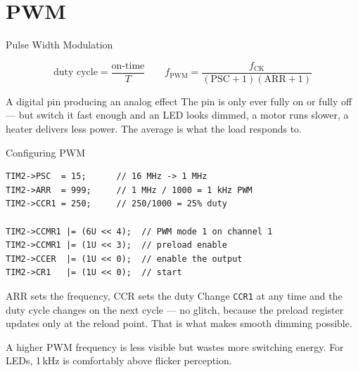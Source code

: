 \documentclass[aspectratio=169]{beamer}
\begin{document}
\section{PWM}

\begin{frame}{Pulse Width Modulation}
\centering
{}

\vspace{1em}
\[
\text{duty cycle} = \frac{\text{on-time}}{T}
\qquad
f_{\text{PWM}} = \frac{f_{\text{CK}}}{(\text{PSC}+1)(\text{ARR}+1)}
\]

\vspace{0.5em}
\begin{block}{A digital pin producing an analog effect}
The pin is only ever fully on or fully off --- but switch it fast enough
and an LED looks dimmed, a motor runs slower, a heater delivers less
power. The average is what the load responds to.
\end{block}
\end{frame}

\begin{frame}[fragile]{Configuring PWM}
\begin{lstlisting}
TIM2->PSC  = 15;      // 16 MHz -> 1 MHz
TIM2->ARR  = 999;     // 1 MHz / 1000 = 1 kHz PWM
TIM2->CCR1 = 250;     // 250/1000 = 25% duty

TIM2->CCMR1 |= (6U << 4);  // PWM mode 1 on channel 1
TIM2->CCMR1 |= (1U << 3);  // preload enable
TIM2->CCER  |= (1U << 0);  // enable the output
TIM2->CR1   |= (1U << 0);  // start
\end{lstlisting}

\begin{block}{ARR sets the frequency, CCR sets the duty}
Change \texttt{CCR1} at any time and the duty cycle changes on the next
cycle --- no glitch, because the preload register updates only at the
reload point. That is what makes smooth dimming possible.
\end{block}

{\small A higher PWM frequency is less visible but wastes more switching
energy. For LEDs, 1\,kHz is comfortably above flicker perception.}
\end{frame}
\end{document}
